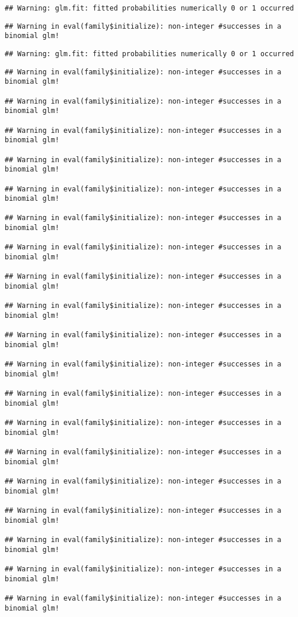 \documentclass[
]{article}
\begin{document}
\begin{verbatim}
## Warning: glm.fit: fitted probabilities numerically 0 or 1 occurred
\end{verbatim}

\begin{verbatim}
## Warning in eval(family$initialize): non-integer #successes in a binomial glm!
\end{verbatim}

\begin{verbatim}
## Warning: glm.fit: fitted probabilities numerically 0 or 1 occurred
\end{verbatim}

\begin{verbatim}
## Warning in eval(family$initialize): non-integer #successes in a binomial glm!

## Warning in eval(family$initialize): non-integer #successes in a binomial glm!

## Warning in eval(family$initialize): non-integer #successes in a binomial glm!

## Warning in eval(family$initialize): non-integer #successes in a binomial glm!

## Warning in eval(family$initialize): non-integer #successes in a binomial glm!

## Warning in eval(family$initialize): non-integer #successes in a binomial glm!

## Warning in eval(family$initialize): non-integer #successes in a binomial glm!

## Warning in eval(family$initialize): non-integer #successes in a binomial glm!

## Warning in eval(family$initialize): non-integer #successes in a binomial glm!

## Warning in eval(family$initialize): non-integer #successes in a binomial glm!

## Warning in eval(family$initialize): non-integer #successes in a binomial glm!

## Warning in eval(family$initialize): non-integer #successes in a binomial glm!

## Warning in eval(family$initialize): non-integer #successes in a binomial glm!

## Warning in eval(family$initialize): non-integer #successes in a binomial glm!

## Warning in eval(family$initialize): non-integer #successes in a binomial glm!

## Warning in eval(family$initialize): non-integer #successes in a binomial glm!

## Warning in eval(family$initialize): non-integer #successes in a binomial glm!

## Warning in eval(family$initialize): non-integer #successes in a binomial glm!

## Warning in eval(family$initialize): non-integer #successes in a binomial glm!
\end{verbatim}
\end{document}
